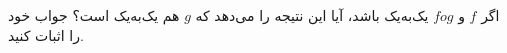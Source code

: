 \EXERCISE
اگر
$f$
و
$f o g$
یک‌به‌یک باشد، آیا این نتیجه را می‌دهد که
$g$
هم یک‌به‌یک است؟ جواب خود را اثبات کنید.